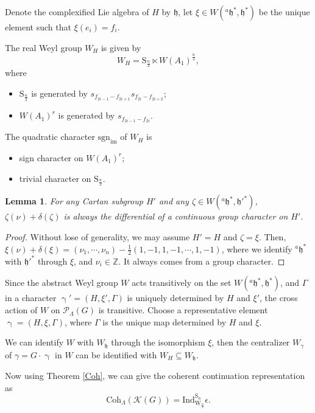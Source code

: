 \documentclass[12pt, a4paper]{amsart}
\numberwithin{equation}{section}
\newtheorem{lem}[thm]{Lemma}
\newcommand{\BZ}{{\mathbb {Z}}}
\newcommand{\CK}{{\mathcal {K}}}
\newcommand{\CP}{{\mathcal {P}}}
\newcommand{\fh}{\mathfrak{h}}
\newcommand{\Ind}{{\mathrm{Ind}}}
\newcommand{\sgn}{{\mathrm{sgn}}}
\begin{document}
Denote the complexified Lie algebra of $H$ by $\fh$, let $\xi \in W({^{a}\fh^*},\fh^*)$ be the unique element such that $\xi(e_i) = f_i$.

The real Weyl group $W_{H}$ is given by
$$W_{H} = \mathrm{S}_{\frac{n}{2}} \ltimes W(A_1)^{\frac{n}{2}},$$
where 
\begin{itemize}
    \item $\mathrm{S}_{\frac{n}{2}}$ is generated by $s_{f_{2i-1}-f_{2i+1}}s_{f_{2i}-f_{2i+2}}$;
    \item $W(A_1)^r$ is generated by $s_{f_{2i-1}-f_{2i}}$.
\end{itemize}



The quadratic character $\sgn_{\mathrm{im}}$ of $W_{H}$ is 
\begin{itemize}
    \item sign character on $W(A_1)^r$;
    \item trivial character on $\mathrm{S}_{\frac{n}{2}}$.
\end{itemize}

\begin{lem}
For any Cartan subgroup $H'$ and any $\zeta \in W({^{a}\fh^*,\fh'^*})$, $\zeta(\nu) + \delta(\zeta)$ is always the differential of a continuous group character on $H'$.
\end{lem}

\begin{proof}
    Without lose of generality, we may assume $H' = H$ and $\zeta = \xi$. Then, $\xi(\nu) + \delta(\xi) = (\nu_1,\cdots,\nu_n) - \frac{1}{2}(1,-1,1,-1,\cdots,1,-1)$, where we identify ${^{a}\fh^*}$ with $\fh'^*$ through $\xi$, and $\nu_i \in \BZ$. It always comes from a group character.
\end{proof}


Since the abstract Weyl group $W$ acts transitively on the set $W({^{a}\fh}^*,\fh^*)$, and $\Gamma$ in a character $\upgamma' = (H,\xi',\Gamma)$ is uniquely determined by $H$ and $\xi'$, the cross action of $W$ on $\CP_{\Lambda}(G)$ is transitive.  Choose a representative element $\upgamma = (H,\xi,\Gamma)$, where $\Gamma$ is the unique map determined by $H$ and $\xi$.

We can identify $W$ with $W_{\fh}$ through the isomorphism $\xi$, then the centralizer $W_{{\gamma}}$ of $\gamma = G \cdot \upgamma$ in $W$ can be identified with $W_{H} \subseteq W_{\fh}$.

Now using Theorem \ref{Coh}, we can give the coherent continuation representation as 
\begin{equation}
    \mathrm{Coh}_{\Lambda}(\CK(G)) = \Ind_{\mathrm{W}_{\frac{n}{2}}}^{\mathrm{S}_n} \epsilon.
\end{equation}
\end{document}
